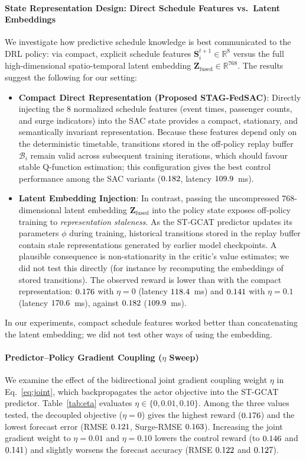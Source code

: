 \paragraph{State Representation Design: Direct Schedule Features vs.\ Latent Embeddings} 
We investigate how predictive schedule knowledge is best communicated to the DRL policy: via compact, explicit schedule features $\mathbf{S}_i^{t+1}\in\mathbb{R}^8$ versus the full high-dimensional spatio-temporal latent embedding $\mathbf{Z}_{\mathrm{fused}}\in\mathbb{R}^{768}$. The results suggest the following for our setting:
\begin{itemize}
  \item \textbf{Compact Direct Representation (Proposed STAG-FedSAC)}: Directly injecting the 8 normalized schedule features (event times, passenger counts, and surge indicators) into the SAC state provides a compact, stationary, and semantically invariant representation. Because these features depend only on the deterministic timetable, transitions stored in the off-policy replay buffer $\mathcal{B}_i$ remain valid across subsequent training iterations, which should favour stable Q-function estimation; this configuration gives the best control performance among the SAC variants ($0.182$, latency $109.9$~ms).
  \item \textbf{Latent Embedding Injection}: In contrast, passing the uncompressed 768-dimensional latent embedding $\mathbf{Z}_{\mathrm{fused}}$ into the policy state exposes off-policy training to \emph{representation staleness}. As the ST-GCAT predictor updates its parameters $\phi$ during training, historical transitions stored in the replay buffer contain stale representations generated by earlier model checkpoints. A plausible consequence is non-stationarity in the critic's value estimates; we did not test this directly (for instance by recomputing the embeddings of stored transitions). The observed reward is lower than with the compact representation: $0.176$ with $\eta=0$ (latency $118.4$~ms) and $0.141$ with $\eta=0.1$ (latency $170.6$~ms), against $0.182$ ($109.9$~ms).
\end{itemize}
In our experiments, compact schedule features worked better than concatenating the latent embedding; we did not test other ways of using the embedding.

\paragraph{Predictor--Policy Gradient Coupling ($\eta$ Sweep)} 
We examine the effect of the bidirectional joint gradient coupling weight $\eta$ in Eq.~\eqref{eq:joint}, which backpropagates the actor objective into the ST-GCAT predictor. Table~\ref{tab:eta} evaluates $\eta \in \{0, 0.01, 0.10\}$. Among the three values tested, the decoupled objective ($\eta=0$) gives the highest reward ($0.176$) and the lowest forecast error (RMSE $0.121$, Surge-RMSE $0.163$). Increasing the joint gradient weight to $\eta=0.01$ and $\eta=0.10$ lowers the control reward (to $0.146$ and $0.141$) and slightly worsens the forecast accuracy (RMSE $0.122$ and $0.127$). 

